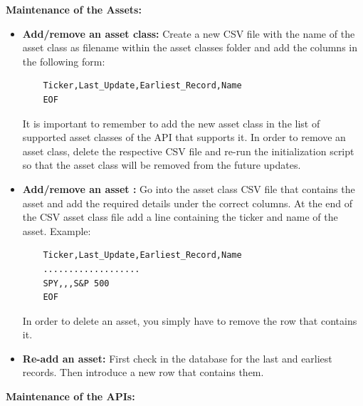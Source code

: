 \documentclass[main.tex]{subfiles}
\begin{document}
\textbf{Maintenance of the Assets:}
\begin{itemize}
    \item \textbf{Add/remove an asset class:} Create a new CSV file with the name of the asset class as filename within the asset classes folder and add the columns in the following form:\newline
    \begin{lstlisting}
    Ticker,Last_Update,Earliest_Record,Name
    EOF
    \end{lstlisting}
    It is important to remember to add the new asset class in the list of supported asset classes of the API that supports it.\newline
    In order to remove an asset class, delete the respective CSV file and re-run the initialization script so that the asset class will be removed from the future updates. 
    \item \textbf{Add/remove an asset : } Go into the asset class CSV file that contains the asset and add the required details under the correct columns.
    At the end of the CSV asset class file add a line containing the ticker and name of the asset.\newline
  	Example:
    \begin{lstlisting}
    Ticker,Last_Update,Earliest_Record,Name
    ...................
    SPY,,,S&P 500
	EOF    
    \end{lstlisting}
    In order to delete an asset, you simply have to remove the row that contains it.
    
    \item \textbf{Re-add an asset:} First check in the database for the last and earliest records. Then introduce a new row that contains them.
\end{itemize}

\textbf{Maintenance of the APIs:}
\end{document}
